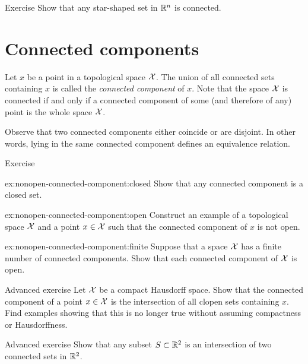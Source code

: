 \begin{thm}{Exercise}\label{ex:connected-star-shaped}
Show that any star-shaped set in $\mathbb{R}^n$ is connected.
\end{thm}


\section{Connected components}

Let $x$ be a point in a topological space $\mathcal{X}$.
The union of all connected sets containing $x$ is called the \emph{connected component} of $x$.
Note that the space $\mathcal{X}$ is connected if and only if a connected component of some (and therefore of any) point is the whole space $\mathcal{X}$.

Observe that two connected components either coincide or are disjoint.
In other words, lying in the same connected component defines an equivalence relation.

\begin{thm}{Exercise}\label{ex:nonopen-connected-component}

\begin{subthm}{ex:nonopen-connected-component:closed}
Show that any connected component is a closed set.
\end{subthm}

\begin{subthm}{ex:nonopen-connected-component:open}
Construct an example of a topological space $\mathcal{X}$ and a point $x\in \mathcal{X}$ such that the connected component of $x$ is not open.
\end{subthm}

\begin{subthm}{ex:nonopen-connected-component:finite}
Suppose that a space $\mathcal{X}$ has a finite number of connected components.
Show that each connected component of $\mathcal{X}$ is open.
\end{subthm}

\end{thm}

\begin{thm}{Advanced exercise}\label{ex:quasi-component}
Let $\mathcal{X}$ be a compact Hausdorff space.
Show that the connected component of a point $x\in \mathcal{X}$ is the intersection of all clopen sets containing $x$.
Find examples showing that this is no longer true without assuming compactness or Hausdorffness.
\end{thm}

\begin{thm}{Advanced exercise}\label{ex:connected-in-R2}
Show that any subset $S\subset \mathbb{R}^2$ is an intersection of two connected sets in $\mathbb{R}^2$.
\end{thm}


